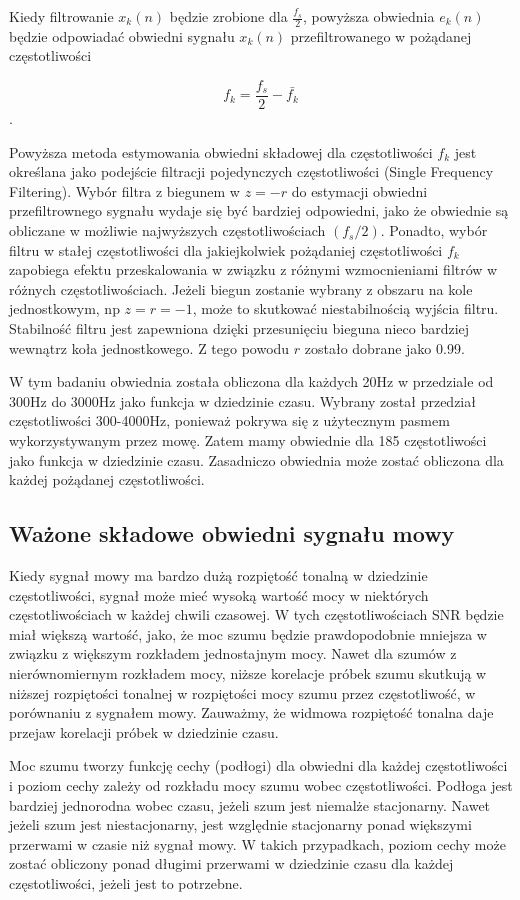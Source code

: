 \documentclass[eng,printmode]{mgr}
\begin{document}
  Kiedy filtrowanie $x_{k}(n)$ będzie zrobione dla $\frac{f_{s}}{2}$, powyższa obwiednia $e_{k}(n)$ będzie odpowiadać obwiedni sygnału $x_{k}(n)$ przefiltrowanego w pożądanej częstotliwości
  
  $$f_{k} = \frac{f_{s}}{2} - \bar{f_{k}}$$.
  
  Powyższa metoda estymowania obwiedni składowej dla częstotliwości $f_{k}$ jest określana jako podejście filtracji pojedynczych częstotliwości (Single Frequency Filtering). Wybór filtra z biegunem w $z=-r$ do estymacji obwiedni przefiltrownego sygnału wydaje się być bardziej odpowiedni, jako że obwiednie są obliczane w możliwie najwyższych częstotliwościach $(f_{s}/2)$. Ponadto, wybór filtru w stałej częstotliwości dla jakiejkolwiek pożądaniej częstotliwości $f_{k}$ zapobiega efektu przeskalowania w związku z różnymi wzmocnieniami filtrów w różnych częstotliwościach. Jeżeli biegun zostanie wybrany z obszaru na kole jednostkowym, np $z=r=-1$, może to skutkować niestabilnością wyjścia filtru. Stabilność filtru jest zapewniona dzięki przesunięciu bieguna nieco bardziej wewnątrz koła jednostkowego. Z tego powodu $r$ zostało dobrane jako 0.99.
  
  W tym badaniu obwiednia została obliczona dla każdych 20Hz w przedziale od 300Hz do 3000Hz jako funkcja w dziedzinie czasu. Wybrany został przedział częstotliwości 300-4000Hz, ponieważ pokrywa się z użytecznym pasmem wykorzystywanym przez mowę. Zatem mamy obwiednie dla 185 częstotliwości jako funkcja w dziedzinie czasu. Zasadniczo obwiednia może zostać obliczona dla każdej pożądanej częstotliwości.
  
  \subsection{Ważone składowe obwiedni sygnału mowy}
  Kiedy sygnał mowy ma bardzo dużą rozpiętość tonalną w dziedzinie częstotliwości, sygnał może mieć wysoką wartość mocy w niektórych częstotliwościach w każdej chwili czasowej. W tych częstotliwościach SNR będzie miał większą wartość, jako, że moc szumu będzie prawdopodobnie mniejsza w związku z większym rozkładem jednostajnym mocy. Nawet dla szumów z nierównomiernym rozkładem mocy, niższe korelacje próbek szumu skutkują w niższej rozpiętości tonalnej w rozpiętości mocy szumu przez częstotliwość, w porównaniu z sygnałem mowy. Zauważmy, że widmowa rozpiętość tonalna daje przejaw korelacji próbek w dziedzinie czasu. 
  
  Moc szumu tworzy funkcję cechy (podłogi) dla obwiedni dla każdej częstotliwości i poziom cechy zależy od rozkładu mocy szumu wobec częstotliwości. Podłoga jest bardziej jednorodna wobec czasu, jeżeli szum jest niemalże stacjonarny. Nawet jeżeli szum jest niestacjonarny, jest względnie stacjonarny ponad większymi przerwami w czasie niż sygnał mowy. W takich przypadkach, poziom cechy może zostać obliczony ponad długimi przerwami w dziedzinie czasu dla każdej częstotliwości, jeżeli jest to potrzebne.
  
\end{document}
